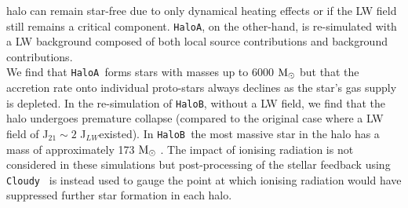 \documentclass[graphics, twocolumn, usenatbib]{mn2e}
\newcommand{\cloudy}{\texttt{Cloudy~}}
\newcommand{\msolar} {$\rm{M_{\odot}}~$}
\newcommand{\JLW} {J$_{LW}$}
\newcommand{\ha} {\texttt{HaloA~}}
\newcommand{\hb} {\texttt{HaloB~}}
\newcommand{\hac} {\texttt{HaloA}}
\newcommand{\hbc} {\texttt{HaloB}}
\begin{document}
  halo can remain star-free due to only dynamical heating effects or if the LW field still
  remains a critical component. \hac, on the other-hand, is re-simulated with a LW background
  composed of both local source contributions and background contributions. \\
  \indent We find that \ha forms stars with masses up to 6000 \msolar but that the accretion
  rate onto individual proto-stars always declines as the star's gas supply is depleted. In the
  re-simulation of \hbc, without a LW field, we find that the halo undergoes premature collapse
  (compared to the original case where a LW field of J$_{21} \sim 2$ \JLW existed). In \hb the
  most massive star in the halo has a mass of approximately 173 \msolar. The impact of ionising
  radiation is not considered in these simulations but post-processing of the stellar feedback
  using \cloudy \citep{Ferland_2017} is instead used to gauge the point at which ionising radiation
  would have suppressed further star formation in each halo. 
  
\end{document}
